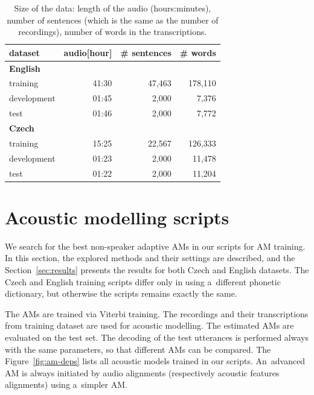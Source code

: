\begin{table}[hbp]
    \centering
    \begin{tabular}{lrrr}
        \hline
        dataset & audio[hour] & \# sentences & \# words \\
        \hline
        \textbf{English} & & & \\
                training & 41:30 & 47,463 & 178,110 \\
                development & 01:45 & 2,000 & 7,376 \\
                test & 01:46 & 2,000 & 7,772 \\
        \hline
        \textbf{Czech} & & & \\
                training & 15:25 & 22,567 & 126,333 \\
                development & 01:23 & 2,000 & 11,478 \\
                test & 01:22 & 2,000 & 11,204 \\
        \hline
		\end{tabular}
    \caption{Size of the data: length of the audio (hours:minutes), number of sentences
        (which is the same as the number of recordings), number of words in the 
    transcriptions.\cite{korvas_2014}}
    \label{tab:audio}
\end{table}





\section{Acoustic modelling scripts}
\label{sec:am_train}

We search for the best non-speaker adaptive \acp{AM} in our scripts for \ac{AM} training. 
In this section, the explored methods and their settings are described, and the Section~\ref{sec:results} presents the results for both Czech and English datasets.
The Czech and English training scripts differ only in using a~different phonetic dictionary, but otherwise the scripts remains exactly the same.

The \acp{AM} are trained via Viterbi training. 
The recordings and their transcriptions from training dataset are used for acoustic modelling.
The estimated \acp{AM} are evaluated on the test set.
The decoding of the test utterances is performed always with the same parameters, so that different \acp{AM} can be compared.
The Figure~\ref{fig:am-deps} lists all acoustic models trained in our scripts.
An~advanced \ac{AM} is always initiated by audio alignments (respectively acoustic features alignments) using a~simpler \ac{AM}.

